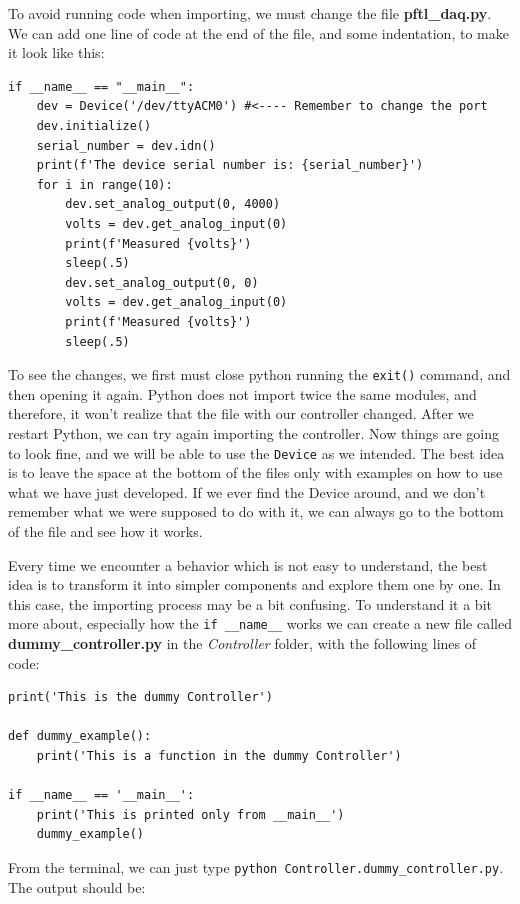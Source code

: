To avoid running code when importing, we must change the file \textbf{pftl\_daq.py}. We can add one line of code at the end of the file, and some indentation, to make it look like this:

\begin{verbatim}
if __name__ == "__main__":
    dev = Device('/dev/ttyACM0') #<---- Remember to change the port
    dev.initialize()
    serial_number = dev.idn()
    print(f'The device serial number is: {serial_number}')
    for i in range(10):
        dev.set_analog_output(0, 4000)
        volts = dev.get_analog_input(0)
        print(f'Measured {volts}')
        sleep(.5)
        dev.set_analog_output(0, 0)
        volts = dev.get_analog_input(0)
        print(f'Measured {volts}')
        sleep(.5)
\end{verbatim}

To see the changes, we first must close python running the \texttt{exit()} command, and then opening it again. Python does not import twice the same modules, and therefore, it won't realize that the file with our controller changed. After we restart Python, we can try again importing the controller. Now things are going to look fine, and we will be able to use the \texttt{Device} as we intended. The best idea is to leave the space at the bottom of the files only with examples on how to use what we have just developed. If we ever find the Device around, and we don't remember what we were supposed to do with it, we can always go to the bottom of the file and see how it works.

Every time we encounter a behavior which is not easy to understand, the best idea is to transform it into simpler components and explore them one by one. In this case, the importing process may be a bit confusing. To understand it a bit more about, especially how the \texttt{if __name__} works we can create a new file called \textbf{dummy\_controller.py} in the \emph{Controller} folder, with the following lines of code:

\begin{verbatim}
print('This is the dummy Controller')

def dummy_example():
    print('This is a function in the dummy Controller')

if __name__ == '__main__':
    print('This is printed only from __main__')
    dummy_example()

\end{verbatim}

From the terminal, we can just type \texttt{python Controller.dummy\_controller.py}. The output should be:

